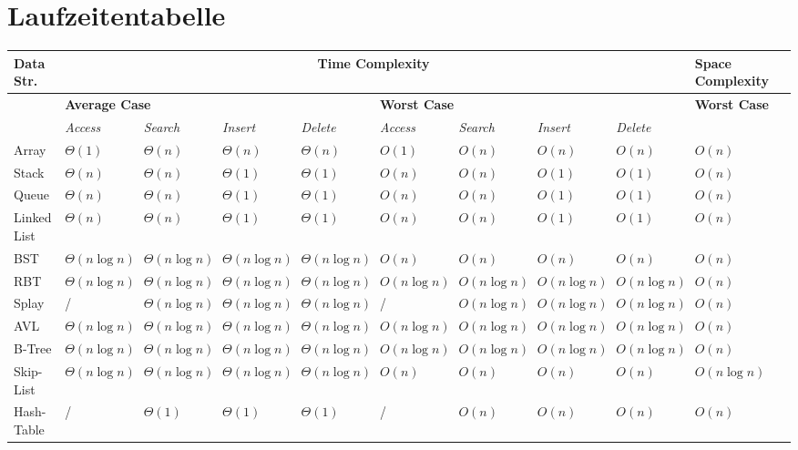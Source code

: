 \section{Laufzeitentabelle}

\begin{table}[h]
\scriptsize
\begin{tabularx}{\textwidth}{l | X X X X | X X X X | l}
    \toprule

    \textbf{Data Str.} & \multicolumn{8}{c|}{\textbf{Time Complexity}} & \textbf{Space Complexity} \\
    \midrule
    & \multicolumn{4}{l|}{\textbf{Average Case}} & \multicolumn{4}{l|}{\textbf{Worst Case}} & \textbf{Worst Case} \\ 
    \midrule
    & \textit{Access} & \textit{Search} & \textit{Insert} & \textit{Delete} & \textit{Access} & \textit{Search} & \textit{Insert} & \textit{Delete} & \\
    \midrule
    Array & $\Theta(1)$ & $\Theta(n)$ & $\Theta(n)$ & $\Theta(n)$ & $O(1)$ & $O(n)$ & $O(n)$ & $O(n)$ & $O(n)$ \\
    \midrule
    Stack & $\Theta(n)$ & $\Theta(n)$ & $\Theta(1)$ & $\Theta(1)$ & $O(n)$ & $O(n)$ & $O(1)$ & $O(1)$ & $O(n)$ \\
    \midrule
    Queue & $\Theta(n)$ & $\Theta(n)$ & $\Theta(1)$ & $\Theta(1)$ & $O(n)$ & $O(n)$ & $O(1)$ & $O(1)$ & $O(n)$ \\
    \midrule
    LinkedList & $\Theta(n)$ & $\Theta(n)$ & $\Theta(1)$ & $\Theta(1)$ & $O(n)$ & $O(n)$ & $O(1)$ & $O(1)$ & $O(n)$ \\
    \midrule
    BST & $\Theta(n \log n)$ & $\Theta(n \log n)$ & $\Theta(n \log n)$ & $\Theta(n \log n)$ & $O(n)$ & $O(n)$ & $O(n)$ & $O(n)$ & $O(n)$ \\
    \midrule
    RBT & $\Theta(n \log n)$ & $\Theta(n \log n)$ & $\Theta(n \log n)$ & $\Theta(n \log n)$ & $O(n \log n)$ & $O(n \log n)$ & $O(n \log n)$ & $O(n \log n)$  & $O(n)$ \\
    \midrule
    Splay & / & $\Theta(n \log n)$ & $\Theta(n \log n)$ & $\Theta(n \log n)$ & / & $O(n \log n)$ & $O(n \log n)$ & $O(n \log n)$  & $O(n)$ \\
    \midrule
    AVL & $\Theta(n \log n)$ & $\Theta(n \log n)$ & $\Theta(n \log n)$ & $\Theta(n \log n)$ & $O(n \log n)$ & $O(n \log n)$ & $O(n \log n)$ & $O(n \log n)$  & $O(n)$ \\
    \midrule
    B-Tree & $\Theta(n \log n)$ & $\Theta(n \log n)$ & $\Theta(n \log n)$ & $\Theta(n \log n)$ & $O(n \log n)$ & $O(n \log n)$ & $O(n \log n)$ & $O(n \log n)$  & $O(n)$ \\
    \midrule
    Skip-List & $\Theta(n \log n)$ & $\Theta(n \log n)$ & $\Theta(n \log n)$ & $\Theta(n \log n)$ & $O(n)$ & $O(n)$ & $O(n)$ & $O(n)$ & $O(n \log n)$ \\
    \midrule
    Hash-Table & / & $\Theta(1)$ & $\Theta(1)$ & $\Theta(1)$ & / & $O(n)$ & $O(n)$ & $O(n)$ & $O(n)$ \\
    \bottomrule
\end{tabularx}
\end{table}

